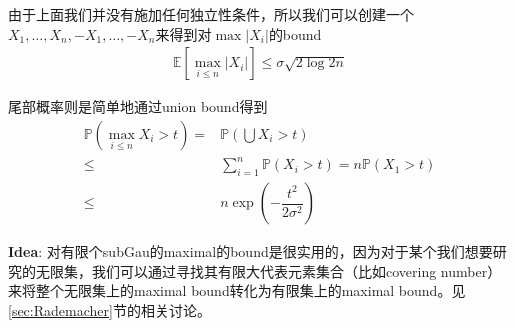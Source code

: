 \documentclass[11pt,a4paper]{ctexart}
\numberwithin{equation}{section}%
\begin{document}
由于上面我们并没有施加任何独立性条件，所以我们可以创建一个$ X_1,\ldots,X_n,-X_1,\ldots,-X_n $来得到对$ \max \left\vert X_i \right\vert  $的bound
\begin{align*}
    \mathbb{E}\left[ \max_{i\leq n} \left\vert X_i \right\vert  \right] \leq \sigma \sqrt{ 2\log 2n } 
\end{align*}

尾部概率则是简单地通过union bound得到
\begin{align*}
    \mathbb{P}\left( \max_{i\leq n} X_i >t \right) =& \mathbb{P}\left( \bigcup X_i>t \right)\\
    \leq & \sum_{i=1}^n \mathbb{P}\left( X_i>t \right) = n\mathbb{P}\left( X_1>t \right)\\
    \leq & n\exp\left( -\dfrac{ t^2 }{ 2\sigma ^2 } \right) 
\end{align*}

{\color{red}\textbf{Idea}:} 对有限个subGau的maximal的bound是很实用的，因为对于某个我们想要研究的无限集，我们可以通过寻找其有限大代表元素集合（比如covering number）来将整个无限集上的maximal bound转化为有限集上的maximal bound。见\ref{sec:Rademacher}节的相关讨论。

    
    

    
\end{document}
